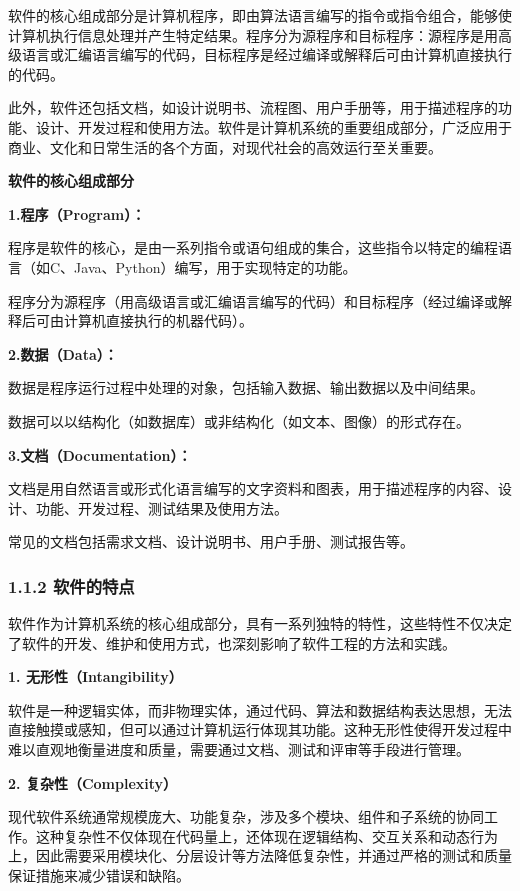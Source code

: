 \documentclass[12pt,a4paper]{article}
\begin{document}
软件的核心组成部分是计算机程序，即由算法语言编写的指令或指令组合，能够使计算机执行信息处理并产生特定结果。程序分为源程序和目标程序：源程序是用高级语言或汇编语言编写的代码，目标程序是经过编译或解释后可由计算机直接执行的代码。

此外，软件还包括文档，如设计说明书、流程图、用户手册等，用于描述程序的功能、设计、开发过程和使用方法。软件是计算机系统的重要组成部分，广泛应用于商业、文化和日常生活的各个方面，对现代社会的高效运行至关重要。

\textbf{软件的核心组成部分}

\textbf{1.程序（Program）：}

程序是软件的核心，是由一系列指令或语句组成的集合，这些指令以特定的编程语言（如C、Java、Python）编写，用于实现特定的功能。

程序分为源程序（用高级语言或汇编语言编写的代码）和目标程序（经过编译或解释后可由计算机直接执行的机器代码）。

\textbf{2.数据（Data）：}

数据是程序运行过程中处理的对象，包括输入数据、输出数据以及中间结果。

数据可以以结构化（如数据库）或非结构化（如文本、图像）的形式存在。

\textbf{3.文档（Documentation）：}

文档是用自然语言或形式化语言编写的文字资料和图表，用于描述程序的内容、设计、功能、开发过程、测试结果及使用方法。

常见的文档包括需求文档、设计说明书、用户手册、测试报告等。

\subsubsection{1.1.2 软件的特点}\label{ux8f6fux4ef6ux7684ux7279ux70b9}

软件作为计算机系统的核心组成部分，具有一系列独特的特性，这些特性不仅决定了软件的开发、维护和使用方式，也深刻影响了软件工程的方法和实践。

\textbf{1. 无形性（Intangibility）}

软件是一种逻辑实体，而非物理实体，通过代码、算法和数据结构表达思想，无法直接触摸或感知，但可以通过计算机运行体现其功能。这种无形性使得开发过程中难以直观地衡量进度和质量，需要通过文档、测试和评审等手段进行管理。

\textbf{2. 复杂性（Complexity）}

现代软件系统通常规模庞大、功能复杂，涉及多个模块、组件和子系统的协同工作。这种复杂性不仅体现在代码量上，还体现在逻辑结构、交互关系和动态行为上，因此需要采用模块化、分层设计等方法降低复杂性，并通过严格的测试和质量保证措施来减少错误和缺陷。
\end{document}
